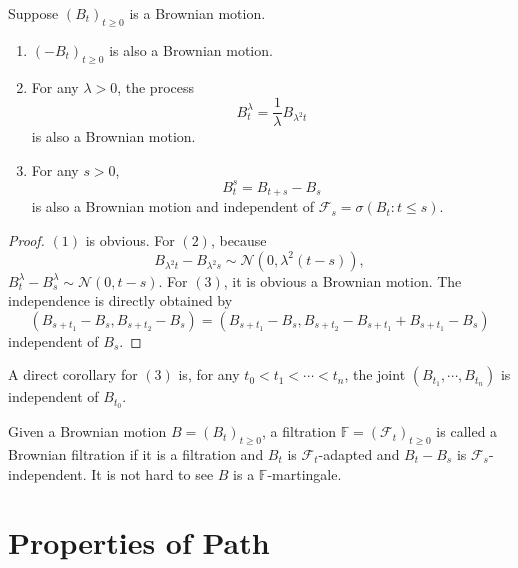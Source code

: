 \begin{thm}
    Suppose $(B_t)_{t \geq 0}$ is a Brownian motion.
    \begin{enumerate}[label=(\arabic*)]
        \item $(-B_t)_{t \geq 0}$ is also a Brownian motion.
        \item For any $\lambda > 0$, the process
        \begin{equation*}
            B^\lambda_t = \frac{1}{\lambda}B_{\lambda^2t}
        \end{equation*}
        is also a Brownian motion.
        \item For any $s > 0$,
        \begin{equation*}
            B^s_t = B_{t+s} - B_s
        \end{equation*}
        is also a Brownian motion and independent of $\mathcal{F}_s = \sigma(B_t : t\leq s)$.
    \end{enumerate}
\end{thm}
\begin{proof}
    $(1)$ is obvious. For $(2)$, because
    \begin{equation*}
        B_{\lambda^2t} - B_{\lambda^2s} \sim \mathcal{N}(0,\lambda^2(t-s)),
    \end{equation*}
    $B^\lambda_t - B^\lambda_s \sim \mathcal{N}(0,t-s)$. For $(3)$, it is obvious a Brownian motion. The independence is directly obtained by
    \begin{equation*}
        (B_{s+t_1}-B_s,B_{s+t_2}-B_s) = (B_{s+t_1} - B_s,B_{s+t_2} - B_{s+t_1} + B_{s+t_1} - B_s) 
    \end{equation*}
    independent of $B_{s}$.
\end{proof}
\begin{rmk}
    A direct corollary for $(3)$ is, for any $t_0 < t_1 < \cdots < t_n$, the joint $(B_{t_1},\cdots,B_{t_n})$ is independent of $B_{t_0}$.
\end{rmk}

\noindent Given a Brownian motion $B=(B_t)_{t \geq 0}$, a filtration $\mathbb{F} = (\mathcal{F}_t)_{t \geq 0}$ is called a Brownian filtration if it is a filtration and $B_t$ is $\mathcal{F}_t$-adapted and $B_t - B_s$ is $\mathcal{F}_s$-independent. It is not hard to see $B$ is a $\mathbb{F}$-martingale.


\section{Properties of Path}

